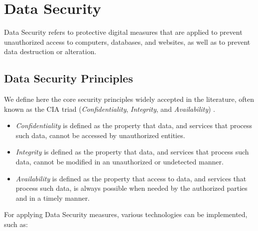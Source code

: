 
\section{Data Security} 
\label{sec:DataSecurity}


Data Security refers to protective digital measures that are applied to prevent unauthorized access to computers, databases, and websites, as well as to prevent data destruction or alteration.


\subsection{Data Security Principles}
\label{ssec:DataProtectionGoals}


We define here the core security principles widely accepted in the literature, often known as the CIA triad (\textit{Confidentiality}, \textit{Integrity}, and \textit{Availability}) \cite{Hansen2015}.

\begin{itemize}
    \setlength\itemsep{1em}

    \item \textit{Confidentiality} is defined as the property that data, and services that process such data, cannot be accessed by unauthorized entities.

    \item \textit{Integrity} is defined as the property that data, and services that process such data, cannot be modified in an unauthorized or undetected manner.

    \item \textit{Availability} is defined as the property that access to data, and services that process such data, is always possible when needed by the authorized parties and in a timely manner.

\end{itemize}


For applying Data Security measures, various technologies can be implemented, such as:

